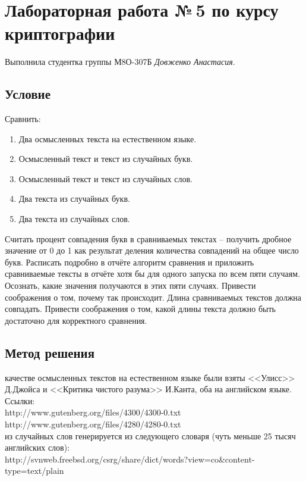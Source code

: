 \documentclass[12pt]{article}
\begin{document}
\section*{Лабораторная работа №\,5 по курсу криптографии}

Выполнила студентка группы М8О-307Б \textit{Довженко Анастасия}.

\subsection*{Условие}
Сравнить:
\begin{enumerate}
\item Два осмысленных текста на естественном языке.
\item Осмысленный текст и текст из случайных букв.
\item Осмысленный текст и текст из случайных слов.
\item Два текста из случайных букв.
\item Два текста из случайных слов.
\end{enumerate}

Считать процент совпадения букв в сравниваемых текстах – получить дробное значение от 0 до 1 как результат деления количества совпадений на общее число букв. Расписать подробно в отчёте алгоритм сравнения и приложить сравниваемые тексты в отчёте хотя бы для одного запуска по всем пяти случаям. Осознать, какие значения получаются в этих пяти случаях. Привести соображения о том, почему так происходит. Длина сравниваемых текстов должна совпадать. Привести соображения о том, какой длины текста должно быть достаточно для корректного сравнения.

\subsection*{Метод решения}
 качестве осмысленных текстов на естественном языке были взяты <<Улисс>> Д.Джойса и <<Критика чистого разума>> И.Канта, оба на английском языке.\\
Ссылки:\\
http://www.gutenberg.org/files/4300/4300-0.txt\\
http://www.gutenberg.org/files/4280/4280-0.txt\\

 из случайных слов генерируется из следующего словаря (чуть меньше 25 тысяч английских слов):\\
http://svnweb.freebsd.org/csrg/share/dict/words?view=co&content-type=text/plain\\
\end{document}
